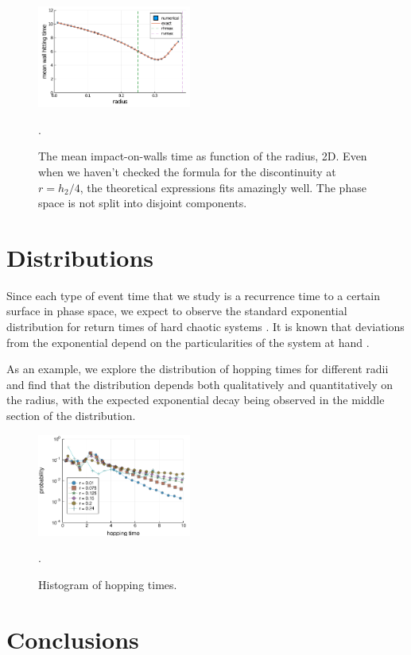 \documentclass[superscriptaddress,pre,reprint,showpacs,twocolumn]{revtex4-1}
\begin{document}
\begin{figure}[h]
  \centering
  \includegraphics[width=0.45\textwidth]{./figures/wall3d.pdf}
  \caption{The mean impact-on-walls time as function of the radius, 2D.
    Even when we haven't checked the formula for
    the discontinuity at $r=h_2/4$, the theoretical expressions fits
    amazingly well. The phase space is not split into disjoint components.}
    \label{wall3d}.
\end{figure}


%
\section{Distributions}

Since each type of event time that we study is a recurrence time to a
certain surface in phase space, we expect to observe the standard
exponential distribution for return times of hard chaotic systems
\cite{Hirata1999}. It is known that deviations from the
exponential depend on the particularities of the system at hand
\cite{Altmann2005}.


As an example, we explore
the distribution of hopping times for different radii and find that the
distribution depends both qualitatively and quantitatively on the
radius, with the expected exponential decay being observed in the middle section
of the distribution. 


\begin{figure}[h]
  \centering
  \includegraphics[width=0.45\textwidth]{figures/histogram_hopping_times.pdf}
  \caption{Histogram of hopping times.}
    \label{histogram_hopping}.
\end{figure}


\section{Conclusions}
\end{document}
